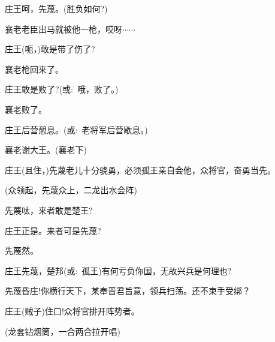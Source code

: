 {庄王\hspace{30pt}呵，先蔑。(胜负如何?)

襄老\hspace{30pt}老臣出马就被他一枪，哎呀$\cdots{}\cdots{}$

庄王\hspace{30pt}(呃，)敢是带了伤了?

襄老\hspace{30pt}枪回来了。

庄王\hspace{30pt}敢是败了?({\akai 或}:~哦，败了。)

襄老\hspace{30pt}败了。

庄王\hspace{30pt}后营憩息。({\akai 或}:~老将军后营歇息。)

襄老\hspace{30pt}谢大王。(襄老{\hwfs 下})

庄王\hspace{30pt}(且住，)先蔑老儿十分骁勇，必须孤王亲自会他，众将官，奋勇当先。

(众{\hwfs 领起}，先蔑众{\hwfs 上}，{\hwfs 二龙出水会阵})

先蔑\hspace{30pt}呔，来者敢是楚王?

庄王\hspace{30pt}正是。来者可是先蔑?

先蔑\hspace{30pt}然。

庄王\hspace{30pt}先蔑，楚邦({\akai 或}:~孤王)有何亏负你国，无故兴兵是何理也?

先蔑\hspace{30pt}昏庄!你横行天下，某奉晋君旨意，领兵扫荡。还不束手受绑？

庄王\hspace{30pt}(贼子)住口!众将官排开阵势者。


(龙套{\hwfs 钻烟筒}，{\hwfs 一合两合拉开唱})


}
